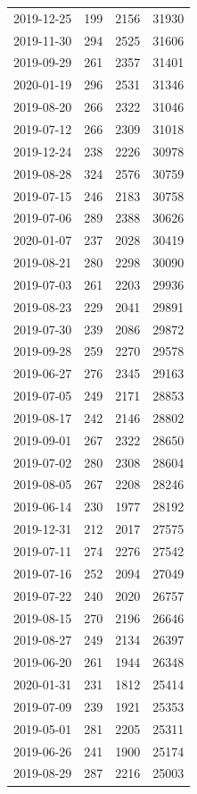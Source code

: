 \begin{tabular}{lrrr}
2019-12-25 & 199 & 2156 & 31930 \\
2019-11-30 & 294 & 2525 & 31606 \\
2019-09-29 & 261 & 2357 & 31401 \\
2020-01-19 & 296 & 2531 & 31346 \\
2019-08-20 & 266 & 2322 & 31046 \\
2019-07-12 & 266 & 2309 & 31018 \\
2019-12-24 & 238 & 2226 & 30978 \\
2019-08-28 & 324 & 2576 & 30759 \\
2019-07-15 & 246 & 2183 & 30758 \\
2019-07-06 & 289 & 2388 & 30626 \\
2020-01-07 & 237 & 2028 & 30419 \\
2019-08-21 & 280 & 2298 & 30090 \\
2019-07-03 & 261 & 2203 & 29936 \\
2019-08-23 & 229 & 2041 & 29891 \\
2019-07-30 & 239 & 2086 & 29872 \\
2019-09-28 & 259 & 2270 & 29578 \\
2019-06-27 & 276 & 2345 & 29163 \\
2019-07-05 & 249 & 2171 & 28853 \\
2019-08-17 & 242 & 2146 & 28802 \\
2019-09-01 & 267 & 2322 & 28650 \\
2019-07-02 & 280 & 2308 & 28604 \\
2019-08-05 & 267 & 2208 & 28246 \\
2019-06-14 & 230 & 1977 & 28192 \\
2019-12-31 & 212 & 2017 & 27575 \\
2019-07-11 & 274 & 2276 & 27542 \\
2019-07-16 & 252 & 2094 & 27049 \\
2019-07-22 & 240 & 2020 & 26757 \\
2019-08-15 & 270 & 2196 & 26646 \\
2019-08-27 & 249 & 2134 & 26397 \\
2019-06-20 & 261 & 1944 & 26348 \\
2020-01-31 & 231 & 1812 & 25414 \\
2019-07-09 & 239 & 1921 & 25353 \\
2019-05-01 & 281 & 2205 & 25311 \\
2019-06-26 & 241 & 1900 & 25174 \\
2019-08-29 & 287 & 2216 & 25003 \\

\end{tabular}
